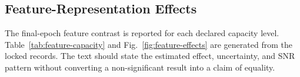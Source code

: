 \subsection{Feature-Representation Effects}
The final-epoch feature contrast is reported for each declared capacity level.
Table~\ref{tab:feature-capacity} and Fig.~\ref{fig:feature-effects} are
generated from the locked records. The text should state the estimated effect,
uncertainty, and SNR pattern without converting a non-significant result into a
claim of equality.
